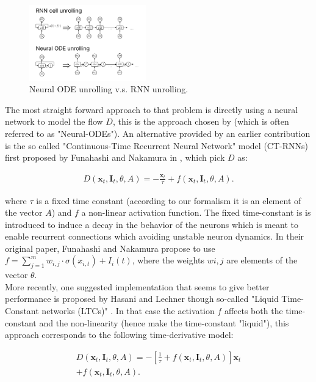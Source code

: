 \begin{figure}[h!]
    \centering
    \includegraphics[width=0.45\textwidth]{figures/unroll.pdf}
    \caption{Neural ODE unrolling v.s. RNN unrolling.}
\end{figure}

 The most straight forward approach to that problem is directly using a neural network to model the flow $D$, this is the approach chosen by \cite{Chen2018NeuralOD} (which is often referred to as "Neural-ODEs"). An alternative provided by an earlier contribution is the so called "Continuous-Time Recurrent Neural Network" model (CT-RNNs) first proposed by Funahashi and Nakamura in \cite{Funahashi1993ApproximationOD}, which pick $D$ as: 
 
\begin{align}
    D(\bm{x}_t, \bm{I}_t, \theta, A) = -\frac{\bm{x}_t}{\tau} + f(\bm{x}_t, \bm{I}_t, \theta, A).
\end{align}

where $\tau$ is a fixed time constant (according to our formalism it is an element of the vector $A$) and $f$ a non-linear activation function. The fixed time-constant is is introduced to induce a decay in the behavior of the neurons which is meant to enable recurrent connections which avoiding unstable neuron dynamics. In their original paper, Funahashi and Nakamura propose to use $f = \sum_{j=1}^m w_{i,j} \cdot \sigma\left( x_{i,t} \right) + I_i (t)$, where the weights $w{i,j}$ are elements of the vector $\theta$. \\

More recently, one suggested implementation that seems to give better performance is proposed by Hasani and Lechner though so-called "Liquid Time-Constant networks (LTCs)" \cite{Hasani2021LiquidTN}. In that case the activation $f$ affects both the time-constant and the non-linearity (hence make the time-constant "liquid"), this approach corresponds to the following time-derivative model:

\begin{align}
    D(\bm{x}_t, \bm{I}_t, \theta, A) = - \left[ \frac{1}{\tau} + f(\bm{x}_t, \bm{I}_t, \theta, A) \right] \bm{x}_t \nonumber \\ + f(\bm{x}_t, \bm{I}_t, \theta, A).
\end{align}

